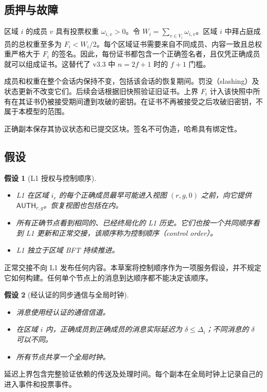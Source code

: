 \documentclass[11pt,a4paper]{article}
\newcommand{\tagg}[1]{\ensuremath{\mathsf{#1}}}
\newtheorem{assumption}[assumption]{假设}
\begin{document}
\subsection{质押与故障}\label{sec:stake}
区域 $i$ 的成员 $v$ 具有投票权重 $\omega_{i,v}>0$。令 $W_i=\sum_{v\in V_i}\omega_{i,v}$。区域 $i$ 中拜占庭成员的总权重至多为 $F_i<W_i/2$。每个区域证书需要来自不同成员、内容一致且总权重严格大于 $F_i$ 的签名。因此，每份证书都包含一个正确签名者，且仅凭正确成员就可以组成证书。这替代了 v3.3 中 $n=2f+1$ 时的 $f+1$ 门槛。

成员和权重在整个会话内保持不变，包括该会话的恢复期间。罚没（slashing）及状态更新不改变它们。后续会话根据旧快照验证旧证书。上界 $F_i$ 计入该快照中所有在其证书仍被接受期间遭到攻破的密钥。在证书不再被接受之后攻破旧密钥，不属于本模型的范围。

正确副本保存其协议状态和已提交区块。签名不可伪造，哈希具有绑定性。

\subsection{假设}\label{sec:assumptions}
\begin{assumption}[L1 授权与控制顺序]\label{ass:authority}\leavevmode\par
\begin{itemize}
\item L1 在区域 $i_r$ 的每个正确成员最早可能进入视图 $(r,g,0)$ 之前，向它提供 $\tagg{AUTH}_{r,g}$。恢复视图也包括在内。
\item 所有正确节点看到相同的、已经终局化的 L1 历史。它们也按一个共同顺序看到 L1 更新和正常交接，该顺序称为\emph{控制顺序}（control order）。
\item L1 独立于区域 BFT 持续推进。
\end{itemize}
\end{assumption}
正常交接不向 L1 发布任何内容。本草案将控制顺序作为一项服务假设，并不规定它如何构建。任何单个节点上的消息到达顺序都不能决定该顺序。

\begin{assumption}[经认证的同步通信与全局时钟]\label{ass:network}\leavevmode\par
\begin{itemize}
\item 消息使用经认证的通信信道。
\item 在区域 $i$ 内，正确成员到正确成员的消息实际延迟为 $\delta\le\Delta_i$；不同消息的 $\delta$ 可以不同。
\item 所有节点共享一个全局时钟。
\end{itemize}
\end{assumption}
延迟上界包含完整验证依赖的传送及处理时间。每个副本在全局时钟上记录自己的进入事件和投票事件。
\end{document}
